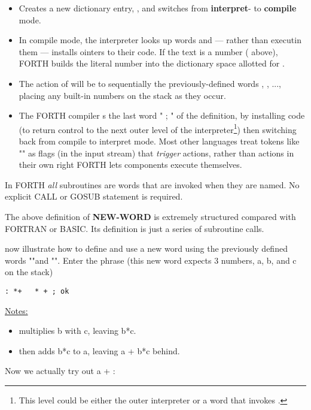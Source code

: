 \begin{itemize}
    \item Creates a new dictionary entry, , and switches from \textbf{interpret}- to \textbf{compile} mode.
    \item In compile mode, the interpreter looks up words and — rather than executin them — installs ointers to their code. If the text is a number ( above), FORTH builds the literal number into the dictionary space allotted for .
    \item The action of  will be to  sequentially the previously-defined words , , ..., placing any built-in numbers on the stack as they occur.
    \item The FORTH compiler s the last word " ; " of the definition, by installing code (to return control to the next outer level of the interpreter\footnote{This level could be either the outer interpreter or a word that invokes .}) then switching back from compile to interpret mode. Most other languages treat tokens like "\regc{;}" as ﬂags (in the input stream) that \textit{trigger} actions, rather than actions in their own right FORTH lets components execute themselves.
\end{itemize}

In FORTH \textit{all} subroutines are words that are invoked when they are named. No explicit CALL or GOSUB statement is required.

The above definition of \textbf{NEW-WORD} is extremely structured compared with FORTRAN or BASIC. Its definition is just a series of subroutine calls.

 now illustrate how to define and use a new word using the previously defined words "\bc{:}"and "\bc{;}". Enter the phrase (this new word \bc{*+} expects 3 numbers, a, b, and c on the stack)

\begin{lstlisting}
: *+   * + ; ok
\end{lstlisting}

\underline{Notes:}
\begin{itemize}
    \item \bc{*} multiplies b with c, leaving b*c.
    \item \bc{+} then adds b*c to a, leaving a + b*c behind.
\end{itemize}

Now we actually try out a + :

